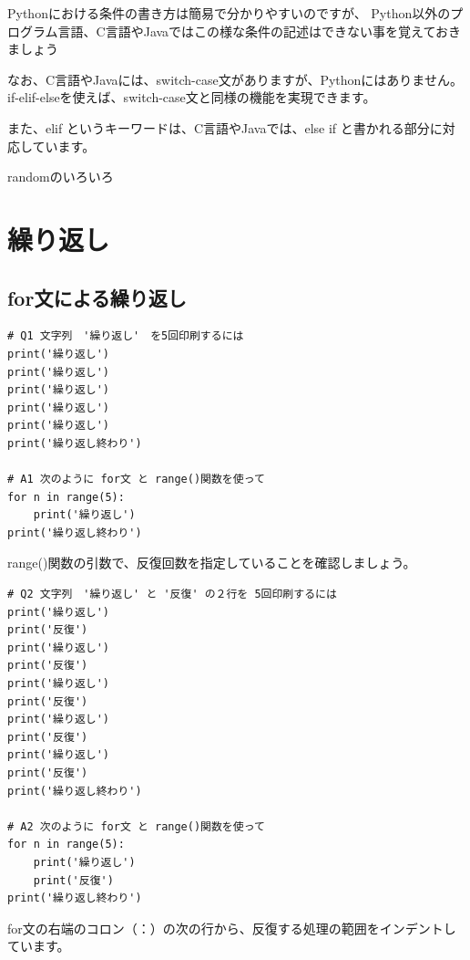 \documentclass[uplatex,a4paper,11pt,oneside,openany]{jsbook}
\begin{document}
Pythonにおける条件の書き方は簡易で分かりやすいのですが、
Python以外のプログラム言語、C言語やJavaではこの様な条件の記述はできない事を覚えておきましょう

なお、C言語やJavaには、switch-case文がありますが、Pythonにはありません。
if-elif-elseを使えば、switch-case文と同様の機能を実現できます。

また、elif というキーワードは、C言語やJavaでは、else if と書かれる部分に対応しています。

randomのいろいろ



\newpage

\section{繰り返し}

\subsection{for文による繰り返し}

\begin{lstlisting}
# Q1 文字列　'繰り返し'　を5回印刷するには
print('繰り返し')
print('繰り返し')
print('繰り返し')
print('繰り返し')
print('繰り返し')
print('繰り返し終わり')

# A1 次のように for文 と range()関数を使って
for n in range(5):
    print('繰り返し')
print('繰り返し終わり')
\end{lstlisting}

range()関数の引数で、反復回数を指定していることを確認しましょう。

\begin{lstlisting}
# Q2 文字列　'繰り返し' と '反復' の２行を 5回印刷するには
print('繰り返し')
print('反復')
print('繰り返し')
print('反復')
print('繰り返し')
print('反復')
print('繰り返し')
print('反復')
print('繰り返し')
print('反復')
print('繰り返し終わり')

# A2 次のように for文 と range()関数を使って
for n in range(5):
    print('繰り返し')
    print('反復')
print('繰り返し終わり')
\end{lstlisting}

for文の右端のコロン（：）の次の行から、反復する処理の範囲をインデントしています。
\end{document}
